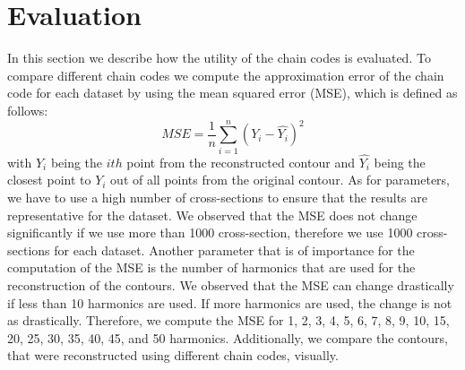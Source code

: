 \documentclass[thesis.tex]{subfiles}
\begin{document}
\section{Evaluation}
In this section we describe how the utility of the chain codes is evaluated. To compare different chain codes we compute the approximation error of the chain code for each dataset by using the mean squared error (MSE), which is defined as follows: 
\begin{equation} \label{eq:mse}
 MSE = \frac{1}{n}\sum_{i=1}^{n}(Y_i - \hat{Y_i})^2
\end{equation} 
with $Y_i$ being the $ith$ point from the reconstructed contour and $\hat{Y_i}$ being the closest point to $Y_i$ out of all points from the original contour. As for parameters, we have to use a high number of cross-sections to ensure that the results are representative for the dataset. We observed that the MSE does not change significantly if we use more than 1000 cross-section, therefore we use 1000 cross-sections for each dataset. Another parameter that is of importance for the computation of the MSE is the number of harmonics that are used for the reconstruction of the contours. We observed that the MSE can change drastically if less than 10 harmonics are used. If more harmonics are used, the change is not as drastically. Therefore, we compute the MSE for 1, 2, 3, 4, 5, 6, 7, 8, 9, 10, 15, 20, 25, 30, 35, 40, 45, and 50 harmonics.
Additionally, we compare the contours, that were reconstructed using different chain codes, visually. 
\end{document}
